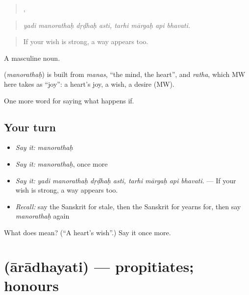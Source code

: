 \begin{quote}
   ,    
\end{quote}

\begin{quote}
\emph{yadi manorathaḥ dṛḍhaḥ asti, tarhi mārgaḥ api bhavati.}
\end{quote}

\begin{quote}
If your wish is strong, a way appears too.
\end{quote}

A masculine noun.

\begin{cousinweb}
\textbf{} (\emph{manorathaḥ}) is built from \emph{manas}, \textquotedblleft{}the mind, the heart\textquotedblright{}, and \emph{ratha}, which MW here takes as \textquotedblleft{}joy\textquotedblright{}: a heart's joy, a wish, a desire (MW).
\end{cousinweb}

\begin{grammarlens}[title={What you've built}]
One more word for saying what happens if.
\end{grammarlens}

\subsection*{Your turn}
\begin{itemize}
\raggedright
  \item \emph{Say it:} \emph{manorathaḥ}
  \item \emph{Say it:} \emph{manorathaḥ}, once more
  \item \emph{Say it:} \emph{yadi manorathaḥ dṛḍhaḥ asti, tarhi mārgaḥ api bhavati.} — If your wish is strong, a way appears too.
  \item \emph{Recall:} say the Sanskrit for stale, then the Sanskrit for yearns for, then say \emph{manorathaḥ} again
\end{itemize}

\begin{tcolorbox}[breakable,colback=teal!4,colframe=teal!35!black,title={Before you move on}]
What does  mean? (\textquotedblleft{}A heart's wish\textquotedblright{}.) Say it once more.
\end{tcolorbox}
\section[\texorpdfstring{\sk{आराधयति} (ārādhayati)}{आराधयति (ārādhayati)}]{ (ārādhayati) — propitiates; honours}

